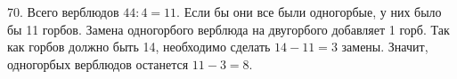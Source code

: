 70. Всего верблюдов $44:4=11.$ Если бы они все были одногорбые, у них было бы 11 горбов. Замена одногорбого верблюда на двугорбого добавляет 1 горб. Так как горбов должно быть 14, необходимо сделать $14-11=3$ замены. Значит, одногорбых верблюдов останется $11-3=8.$\\
